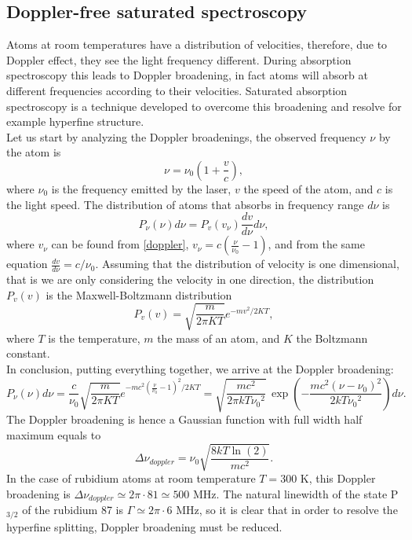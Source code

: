 \documentclass[a4paper,10pt]{article}
\begin{document}
\subsection{Doppler-free saturated spectroscopy}
Atoms at room temperatures have a distribution of velocities, therefore, due to Doppler effect, they see the light frequency different. During absorption spectroscopy this leads to Doppler broadening, in fact atoms will absorb at different frequencies according to their velocities. Saturated absorption spectroscopy is a technique developed to overcome this broadening and resolve for example hyperfine structure.\\
Let us start by analyzing the Doppler broadenings, the observed frequency $\nu$ by the atom is 
\begin{equation}\label{doppler}\nu = \nu_0\left(1+\frac{v}{c}\right),\end{equation}
where $\nu_0$ is the frequency emitted by the laser, $v$ the speed of the atom, and $c$ is the light speed. The distribution of atoms that absorbs in frequency range $d\nu$ is
\[P_{\nu}(\nu)d\nu = P_v(v_\nu)\frac{dv}{d\nu}d\nu,\]
where $v_\nu$ can be found from \eqref{doppler}, $v_\nu = c\left(\frac{\nu}{\nu_0}-1\right)$, and from the same equation $\frac{dv}{d\nu} = c/\nu_0$.  Assuming that the distribution of velocity is one dimensional, that is we are only considering the velocity in one direction, the distribution $P_v(v)$ is the Maxwell-Boltzmann distribution
\[P_v(v) = \sqrt{\frac{m}{2\pi K T}}e^{-mv^2/2KT},\]
where $T$ is the temperature, $m$ the mass of an atom, and $K$ the Boltzmann constant.\\
In conclusion, putting everything together, we arrive at the Doppler broadening:
\[P_{\nu}(\nu)d\nu = \frac{c}{\nu_0}\sqrt{\frac{m}{2\pi K T}}e^{-mc^2\left(\frac{\nu}{\nu_0}-1\right)^2/2KT} =\sqrt{\frac{mc^2}{2\pi kT {\nu_0}^2}}\,\exp\left(-\frac{mc^2\left(\nu-\nu_0\right)^2}{2kT {\nu_0}^2}\right)d\nu. \]
The Doppler broadening is hence a Gaussian function with full width half maximum equals to
\[\Delta \nu_{doppler} = \nu_0\sqrt{\frac{8 k T \ln(2)}{mc^2}}.\]
In the case of rubidium atoms at room temperature $T=300$ K, this Doppler broadening is \cite{dopplerbroadening} $\Delta \nu_{doppler} \simeq 2\pi\cdot 81 \simeq 500$ MHz. The natural linewidth of the state P$_{3/2}$ of the rubidium 87 is \cite{rubidium87data} $\Gamma \simeq 2\pi \cdot 6$ MHz, so it is clear that in order to resolve the hyperfine splitting, Doppler broadening must be reduced.\\
\end{document}
